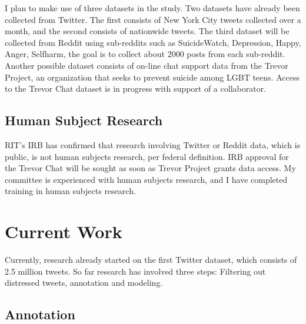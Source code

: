 I plan to make use of three datasets in the study. Two datasets have already been collected from Twitter. The first consists of  New York City tweets collected over a month, and the second consists of nationwide tweets. The third  dataset will be collected from Reddit using sub-reddits such as SuicideWatch, Depression, Happy, Anger, Selfharm, the goal is to collect about 2000 posts from each sub-reddit.  Another possible dataset consists of on-line chat support data from the Trevor Project, an organization that seeks to prevent suicide among LGBT teens. Access to the Trevor Chat dataset is in progress with support of a collaborator. 

\subsection{Human Subject Research}

RIT's IRB has confirmed that research involving Twitter or Reddit data, which is public, is not human subjects research, per federal definition. IRB approval for the Trevor Chat will be sought as soon as Trevor Project grants data access. My committee is experienced with human subjects research, and I have completed training in human subjects research.

\section{Current Work}

Currently, research already started on the first Twitter dataset, which consists of 2.5 million tweets. So far research has involved three steps: Filtering out distressed tweets, annotation and modeling. 


\subsection{Annotation}

